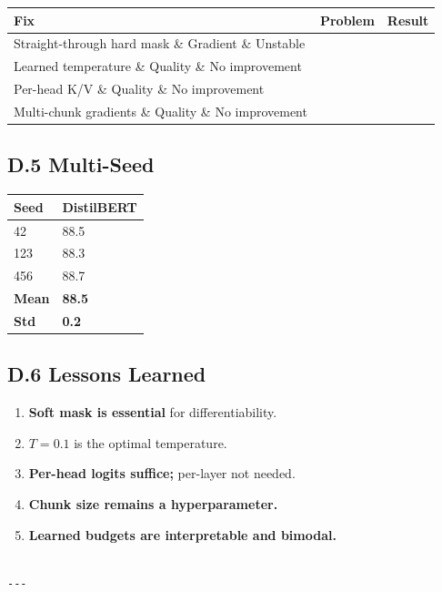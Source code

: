 \begin{table}[H]
\centering
\small
\begin{tabular}{lll}
\toprule
\textbf{Fix} & \textbf{Problem} & \textbf{Result} \\
\midrule
Straight-through hard mask \& Gradient \& Unstable \\
Learned temperature \& Quality \& No improvement \\
Per-head K/V \& Quality \& No improvement \\
Multi-chunk gradients \& Quality \& No improvement \\
\bottomrule
\end{tabular}
\end{table}

\subsection{D.5 Multi-Seed}

\begin{table}[H]
\centering
\small
\begin{tabular}{ll}
\toprule
\textbf{Seed} & \textbf{DistilBERT} \\
\midrule
42 & 88.5 \\
123 & 88.3 \\
456 & 88.7 \\
\textbf{Mean} & \textbf{88.5} \\
\textbf{Std} & \textbf{0.2} \\
\bottomrule
\end{tabular}
\end{table}

\subsection{D.6 Lessons Learned}

\begin{enumerate}
\item \textbf{Soft mask is essential} for differentiability.
\item \textbf{$T = 0.1$} is the optimal temperature.
\item \textbf{Per-head logits suffice;} per-layer not needed.
\item \textbf{Chunk size remains a hyperparameter.}
\item \textbf{Learned budgets are interpretable and bimodal.}
\end{enumerate}
\begin{lstlisting}

---
\end{lstlisting}



